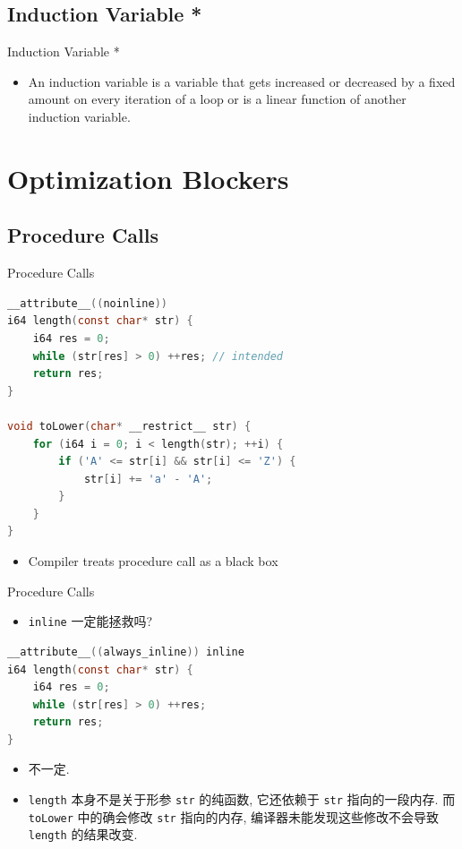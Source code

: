 ﻿\documentclass{ctexbeamer}
\begin{document}
\subsection{Induction Variable *}

\begin{frame}{Induction Variable *}
  \begin{itemize}
    \item An induction variable is a variable that gets increased or decreased by a fixed amount on every iteration of a loop or is a linear function of another induction variable.
  \end{itemize}
\end{frame}

\section{Optimization Blockers}

\subsection{Procedure Calls}

\begin{frame}{Procedure Calls}
  \begin{lstlisting}[language=C]
__attribute__((noinline))
i64 length(const char* str) {
    i64 res = 0;
    while (str[res] > 0) ++res; // intended
    return res;
}

void toLower(char* __restrict__ str) {
    for (i64 i = 0; i < length(str); ++i) {
        if ('A' <= str[i] && str[i] <= 'Z') {
            str[i] += 'a' - 'A';
        }
    }
}
  \end{lstlisting}

  \pause
  \begin{itemize}
    \item Compiler treats procedure call as a black box
  \end{itemize}
\end{frame}

\begin{frame}{Procedure Calls}
  \begin{itemize}
    \item \texttt{inline} 一定能拯救吗?
  \end{itemize}

  \begin{lstlisting}[language=C]
__attribute__((always_inline)) inline
i64 length(const char* str) {
    i64 res = 0;
    while (str[res] > 0) ++res;
    return res;
}
  \end{lstlisting}

  \pause
  \begin{itemize}
    \item 不一定.
    \pause
    \item \texttt{length} 本身不是关于形参 \texttt{str} 的纯函数, 它还依赖于 \texttt{str} 指向的一段内存. 而 \texttt{toLower} 中的确会修改 \texttt{str} 指向的内存, 编译器未能发现这些修改不会导致 \texttt{length} 的结果改变.
  \end{itemize}
\end{frame}
\end{document}
